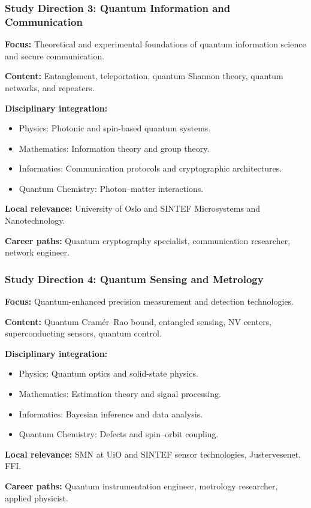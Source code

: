 \documentclass{beamer}
\begin{document}
\begin{frame}
\frametitle{Study Direction 3: Quantum Information and Communication}
\textbf{Focus:} Theoretical and experimental foundations of quantum information science and secure communication.

\textbf{Content:} Entanglement, teleportation, quantum Shannon theory, quantum networks, and repeaters.

\textbf{Disciplinary integration:}
\begin{itemize}
    \item Physics: Photonic and spin-based quantum systems.
    \item Mathematics: Information theory and group theory.
    \item Informatics: Communication protocols and cryptographic architectures.
    \item Quantum Chemistry: Photon–matter interactions.
\end{itemize}

\textbf{Local relevance:} University of Oslo and SINTEF Microsystems and Nanotechnology.

\textbf{Career paths:} Quantum cryptography specialist, communication researcher, network engineer.

\end{frame}


\begin{frame}
\frametitle{Study Direction 4: Quantum Sensing and Metrology}
\textbf{Focus:} Quantum-enhanced precision measurement and detection technologies.

\textbf{Content:} Quantum Cramér–Rao bound, entangled sensing, NV centers, superconducting sensors, quantum control.

\textbf{Disciplinary integration:}
\begin{itemize}
    \item Physics: Quantum optics and solid-state physics.
    \item Mathematics: Estimation theory and signal processing.
    \item Informatics: Bayesian inference and data analysis.
    \item Quantum Chemistry: Defects and spin–orbit coupling.
\end{itemize}

\textbf{Local relevance:} SMN  at UiO and SINTEF sensor technologies, Justervesenet, FFI.

\textbf{Career paths:} Quantum instrumentation engineer, metrology researcher, applied physicist.

\end{frame}
\end{document}

